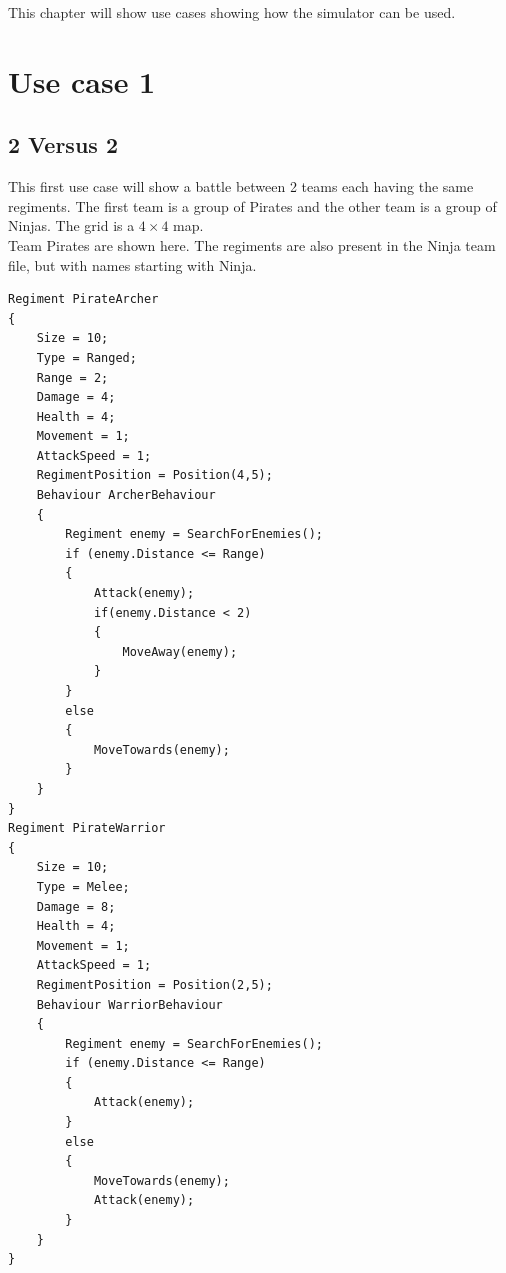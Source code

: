 This chapter will show use cases showing how the simulator can be used.

\section{Use case 1}
	\subsection*{2 Versus 2}
	This first use case will show a battle between 2 teams each having the same regiments.
	The first team is a group of Pirates and the other team is a group of Ninjas. The grid is a $4 \times 4$ map. \\
	Team Pirates are shown here. The regiments are also present in the Ninja team file, but with names starting with Ninja.
\begin{lstlisting}
Regiment PirateArcher
{
	Size = 10;
	Type = Ranged;
	Range = 2;
	Damage = 4;
	Health = 4;
	Movement = 1;
	AttackSpeed = 1;
	RegimentPosition = Position(4,5);
	Behaviour ArcherBehaviour
	{
		Regiment enemy = SearchForEnemies();
		if (enemy.Distance <= Range)
		{
			Attack(enemy);
			if(enemy.Distance < 2)
			{
				MoveAway(enemy);
			}
		}
		else
		{
			MoveTowards(enemy);
		}
	}
}
Regiment PirateWarrior
{
	Size = 10;
	Type = Melee;
	Damage = 8;
	Health = 4;
	Movement = 1;
	AttackSpeed = 1;
	RegimentPosition = Position(2,5);
	Behaviour WarriorBehaviour
	{
		Regiment enemy = SearchForEnemies();
		if (enemy.Distance <= Range)
		{
			Attack(enemy);
		}
		else
		{
			MoveTowards(enemy);
			Attack(enemy);
		}
	}
}
\end{lstlisting}

